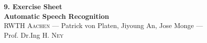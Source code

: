 \documentclass[12pt,oneside,a4paper]{article}
\begin{document}
\begin{center}
{\LARGE \bfseries 
 9. Exercise Sheet  \\[0.1cm] 
}
{ \large \bfseries
 Automatic Speech Recognition \\[0.3cm] %
}
{\large
  \textsc{RWTH Aachen} --- Patrick von Platen, Jiyoung An, Jose Monge ---\\[0.3cm]
}
{\normalsize
  Prof. Dr.Ing H. \textsc{Ney} \\[0.92cm] %
}
\end{center}
 
\newpage
 

\end{document}
